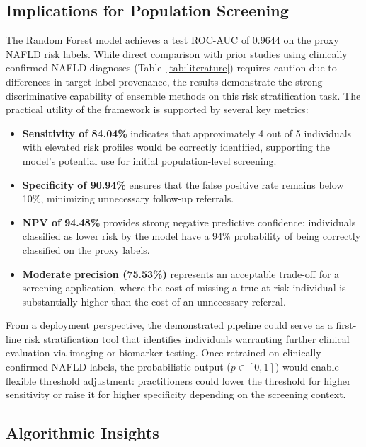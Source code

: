 \documentclass[conference,10pt]{IEEEtran}
\begin{document}
\subsection{Implications for Population Screening}

The Random Forest model achieves a test ROC-AUC of 0.9644 on the proxy NAFLD risk labels. While direct comparison with prior studies using clinically confirmed NAFLD diagnoses (Table~\ref{tab:literature}) requires caution due to differences in target label provenance, the results demonstrate the strong discriminative capability of ensemble methods on this risk stratification task. The practical utility of the framework is supported by several key metrics:

\begin{itemize}
    \item \textbf{Sensitivity of 84.04\%} indicates that approximately 4 out of 5 individuals with elevated risk profiles would be correctly identified, supporting the model's potential use for initial population-level screening.

    \item \textbf{Specificity of 90.94\%} ensures that the false positive rate remains below 10\%, minimizing unnecessary follow-up referrals.

    \item \textbf{NPV of 94.48\%} provides strong negative predictive confidence: individuals classified as lower risk by the model have a 94\% probability of being correctly classified on the proxy labels.

    \item \textbf{Moderate precision (75.53\%)} represents an acceptable trade-off for a screening application, where the cost of missing a true at-risk individual is substantially higher than the cost of an unnecessary referral.
\end{itemize}

From a deployment perspective, the demonstrated pipeline could serve as a first-line risk stratification tool that identifies individuals warranting further clinical evaluation via imaging or biomarker testing. Once retrained on clinically confirmed NAFLD labels, the probabilistic output ($p \in [0, 1]$) would enable flexible threshold adjustment: practitioners could lower the threshold for higher sensitivity or raise it for higher specificity depending on the screening context.

\subsection{Algorithmic Insights}
\end{document}
